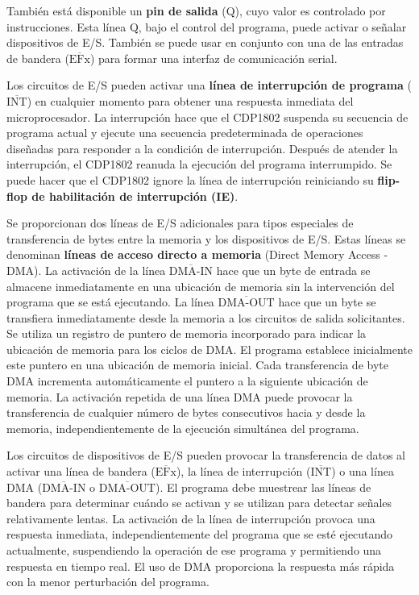 También está disponible un \textbf{pin de salida} (Q), cuyo valor es controlado por instrucciones. Esta línea Q, bajo el control del programa, puede activar o señalar dispositivos de E/S. También se puede usar en conjunto con una de las entradas de bandera ($ \overline{\text{EFx}} $) para formar una interfaz de comunicación serial.

Los circuitos de E/S pueden activar una \textbf{línea de interrupción de programa} ($ \overline{\text{INT}} $) en cualquier momento para obtener una respuesta inmediata del microprocesador. La interrupción hace que el CDP1802 suspenda su secuencia de programa actual y ejecute una secuencia predeterminada de operaciones diseñadas para responder a la condición de interrupción. Después de atender la interrupción, el CDP1802 reanuda la ejecución del programa interrumpido. Se puede hacer que el CDP1802 ignore la línea de interrupción reiniciando su \textbf{flip-flop de habilitación de interrupción (IE)}.

Se proporcionan dos líneas de E/S adicionales para tipos especiales de transferencia de bytes entre la memoria y los dispositivos de E/S. Estas líneas se denominan \textbf{líneas de acceso directo a memoria} (Direct Memory Access - DMA). La activación de la línea $ \overline{\text{DMA-IN}} $ hace que un byte de entrada se almacene inmediatamente en una ubicación de memoria sin la intervención del programa que se está ejecutando. La línea $ \overline{\text{DMA-OUT}} $ hace que un byte se transfiera inmediatamente desde la memoria a los circuitos de salida solicitantes. Se utiliza un registro de puntero de memoria incorporado para indicar la ubicación de memoria para los ciclos de DMA. El programa establece inicialmente este puntero en una ubicación de memoria inicial. Cada transferencia de byte DMA incrementa automáticamente el puntero a la siguiente ubicación de memoria. La activación repetida de una línea DMA puede provocar la transferencia de cualquier número de bytes consecutivos hacia y desde la memoria, independientemente de la ejecución simultánea del programa.

Los circuitos de dispositivos de E/S pueden provocar la transferencia de datos al activar una línea de bandera ($ \overline{\text{EFx}} $), la línea de interrupción ($ \overline{\text{INT}} $) o una línea DMA ($ \overline{\text{DMA-IN}} $ o $ \overline{\text{DMA-OUT}} $). El programa debe muestrear las líneas de bandera para determinar cuándo se activan y se utilizan para detectar señales relativamente lentas. La activación de la línea de interrupción provoca una respuesta inmediata, independientemente del programa que se esté ejecutando actualmente, suspendiendo la operación de ese programa y permitiendo una respuesta en tiempo real. El uso de DMA proporciona la respuesta más rápida con la menor perturbación del programa.

